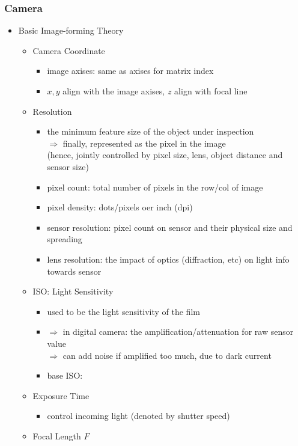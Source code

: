 \subsubsection{Camera}
\begin{itemize}
\item Basic Image-forming Theory
	\begin{itemize}
	\item Camera Coordinate
		\begin{itemize}
		\item image axises: same as axises for matrix index
		\item $x,y$ align with the image axises, $z$ align with focal line
		\end{itemize}
	\item Resolution
		\begin{itemize}
		\item the minimum feature size of the object under inspection \\
		$\Rightarrow$ finally, represented as the pixel in the image \\
		(hence, jointly controlled by pixel size, lens, object distance and sensor size)
		\item pixel count: total number of pixels in the row/col of image
		\item pixel density: dots/pixels oer inch (dpi)
		\item sensor resolution: pixel count on sensor and their physical size and spreading
		\item lens resolution: the impact of optics (diffraction, etc) on light info towards sensor
		\end{itemize}
	\item ISO: Light Sensitivity
		\begin{itemize}
		\item used to be the light sensitivity of the film
		\item $\Rightarrow$ in digital camera: the amplification/attenuation for raw sensor value \\
		$\Rightarrow$ can add noise if amplified too much, due to dark current
		\item base ISO: 
		\end{itemize}
	\item Exposure Time
		\begin{itemize}
		\item control incoming light (denoted by shutter speed)
		\end{itemize}
	\item Focal Length $F$

\end{itemize}
\end{itemize}
